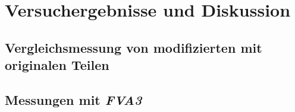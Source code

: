 \chapter{Versuchergebnisse und Diskussion}
\label{chap:ergebnisse_und_diskussion}

\section{Vergleichsmessung von modifizierten mit originalen Teilen}
\label{sec:vergleichsmessung}

\section{Messungen mit \textit{FVA3}}
\label{sec:messungen_mit_fva3}

